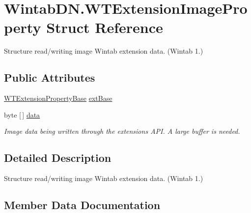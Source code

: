 \hypertarget{struct_wintab_d_n_1_1_w_t_extension_image_property}{}\section{Wintab\+D\+N.\+W\+T\+Extension\+Image\+Property Struct Reference}
\label{struct_wintab_d_n_1_1_w_t_extension_image_property}


Structure read/writing image Wintab extension data. (Wintab 1.)  


\subsection*{Public Attributes}
\begin{DoxyCompactItemize}
\item 
\mbox{\hyperlink{struct_wintab_d_n_1_1_w_t_extension_property_base}{W\+T\+Extension\+Property\+Base}} \mbox{\hyperlink{struct_wintab_d_n_1_1_w_t_extension_image_property_a3afbd1d9df17e3e84a42786ba23472cd}{ext\+Base}}
\item 
byte \mbox{[}$\,$\mbox{]} \mbox{\hyperlink{struct_wintab_d_n_1_1_w_t_extension_image_property_a843717b4123b1bf87e4349fe37906cd5}{data}}
\begin{DoxyCompactList}\small\item\em Image data being written through the extensions A\+PI. A large buffer is needed. \end{DoxyCompactList}\end{DoxyCompactItemize}


\subsection{Detailed Description}
Structure read/writing image Wintab extension data. (Wintab 1.) 



\subsection{Member Data Documentation}
\mbox{\label{struct_wintab_d_n_1_1_w_t_extension_image_property_a843717b4123b1bf87e4349fe37906cd5}} 
